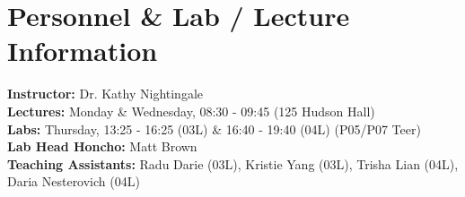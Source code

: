 \section{Personnel \& Lab / Lecture Information}
\textbf{Instructor:} Dr. Kathy Nightingale \\
\textbf{Lectures:} Monday \& Wednesday,  08:30 - 09:45 (125 Hudson Hall)\\
\textbf{Labs:} Thursday, 13:25 - 16:25 (03L) \& 16:40 - 19:40 (04L) (P05/P07 Teer)\\
\textbf{Lab Head Honcho:} Matt Brown\\
\textbf{Teaching Assistants:} Radu Darie (03L), Kristie Yang (03L), Trisha Lian (04L), Daria Nesterovich (04L) \\
